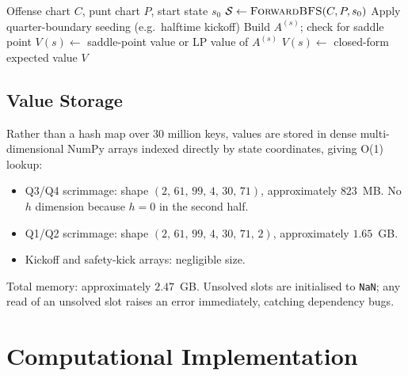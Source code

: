 \documentclass[11pt,letterpaper]{article}
\begin{document}
\begin{algorithm}[ht]
\caption{Full-game backward induction solver}
\label{alg:solve}
\begin{algorithmic}[1]
\Require Offense chart $C$, punt chart $P$, start state $s_0$
\State $\mathcal{S} \gets \textsc{ForwardBFS}(C, P, s_0)$ 
  \State Apply quarter-boundary seeding (e.g.\ halftime kickoff)
        \State Build $A^{(s)}$; check for saddle point
        \State $V(s) \gets$ saddle-point value or LP value of $A^{(s)}$
        \State $V(s) \gets$ closed-form expected value
      \EndIf
    \EndFor
  \EndFor
\EndFor
\Return $V$
\end{algorithmic}
\end{algorithm}

\subsection{Value Storage}

Rather than a hash map over 30 million keys, values are stored in dense multi-dimensional
NumPy arrays indexed directly by state coordinates, giving O(1) lookup:
\begin{itemize}
  \item Q3/Q4 scrimmage: shape $(2,\, 61,\, 99,\, 4,\, 30,\, 71)$, approximately
        $823$~MB.  No $h$ dimension because $h=0$ in the second half.
  \item Q1/Q2 scrimmage: shape $(2,\, 61,\, 99,\, 4,\, 30,\, 71,\, 2)$, approximately
        $1.65$~GB.
  \item Kickoff and safety-kick arrays: negligible size.
\end{itemize}
Total memory: approximately $2.47$~GB.  Unsolved slots are initialised to \texttt{NaN};
any read of an unsolved slot raises an error immediately, catching dependency bugs.

\section{Computational Implementation}
\label{sec:implementation}
\end{document}
